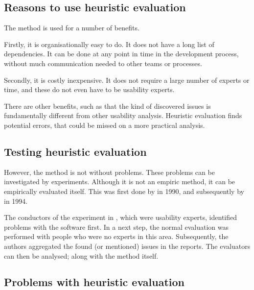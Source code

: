\documentclass[sigchi]{acmart}
\begin{document}
\subsection{Reasons to use heuristic evaluation}
The method is used for a number of benefits.

Firstly, it is organisationally easy to do.  It does not have a long list of dependencies. It can be done at any point in time in the development process, without much communication needed to other teams or processes.~\cite{evalmethods2018}

Secondly, it is costly inexpensive. It does not require a large number of experts or time, and these do not even have to be usability experts.~\cite{evalmethods2018}

There are other benefits, such as that the kind of discovered issues is fundamentally different from other usability analysis. Heuristic evaluation finds potential errors, that could be missed on a more practical analysis.

\subsection{Testing heuristic evaluation}
However, the method is not without problems. These problems can be investigated by experiments. Although it is not an empiric method, it can be empirically evaluated itself. This was first done by \citeauthor{heureval1990} in 1990\cite{heureval1990}, and subsequently by \citeauthor{conducthe1994} in 1994\cite{conducthe1994}.

The conductors of the experiment in \cite{heureval1990}, which were usability experts, identified problems with the software first. In a next step, the normal evaluation was performed with people who were no experts in this area. Subsequently, the authors aggregated the found (or mentioned) issues in the reports. The evaluators can then be analysed; along with the method itself.

\subsection{Problems with heuristic evaluation}
\end{document}

